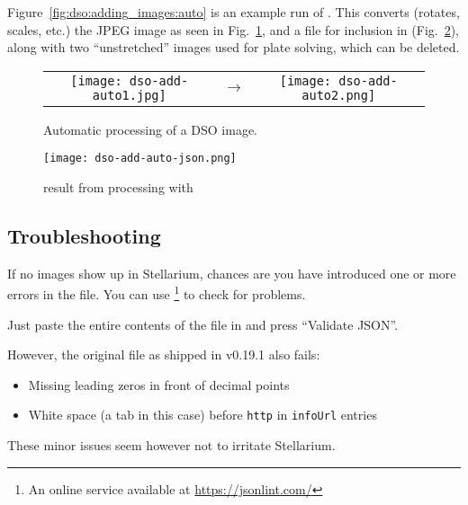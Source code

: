 Figure~\ref{fig:dso:adding_images:auto} is an example run of
.  This converts
(rotates, scales, etc.) the JPEG image as seen in
Fig.~\ref{fig:dso:adding_images:auto-result}, and a  file
for inclusion in 
(Fig.~\ref{fig:dso:adding_images:auto-json}), along with two
``unstretched''  images used for plate solving,
which can be deleted.

\begin{figure}[htbp]
  \centering
  \begin{tabular}{ccc}
    \texttt{[image: dso-add-auto1.jpg]}&$\rightarrow$&
    \texttt{[image: dso-add-auto2.png]}
  \end{tabular}
  \caption{Automatic processing of a DSO image.}
  \label{fig:dso:adding_images:auto-result}
\end{figure}
\begin{figure}[htbp]
\centering\texttt{[image: dso-add-auto-json.png]}
\caption{ result from processing with }
\label{fig:dso:adding_images:auto-json}
\end{figure}

\subsection{Troubleshooting}


If no images show up in Stellarium, chances are you have introduced
one or more errors in the  file.  You can use
 \footnote{An online service available at
  \url{https://jsonlint.com/}} to check for problems.

Just paste the entire contents of the file in and press ``Validate JSON''.

However, the original   file as shipped in v0.19.1 also fails:
\begin{itemize}
\item Missing leading zeros in front of decimal points
\item White space (a tab in this case) before \texttt{http} in \texttt{infoUrl} entries
\end{itemize}
These minor issues seem however not to irritate Stellarium.


\iffalse 
{}

